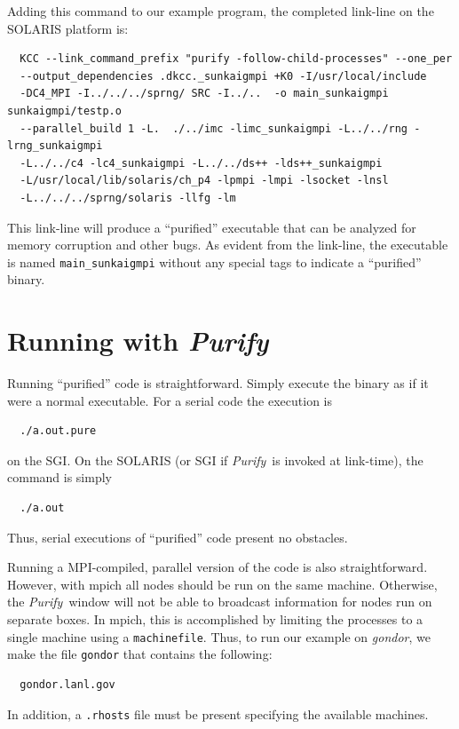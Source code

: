 \documentclass[note]{newmemo}
\newcommand{\purify}{\textsl{Purify}}
\newcommand{\pkg}[1]{\textsf{#1}}
\newcommand{\dir}[1]{\textsl{#1}}
\begin{document}
Adding this command to our example program, the completed link-line
on the SOLARIS platform is:
\begin{verbatim}
  KCC --link_command_prefix "purify -follow-child-processes" --one_per 
  --output_dependencies .dkcc._sunkaigmpi +K0 -I/usr/local/include 
  -DC4_MPI -I../../../sprng/ SRC -I../..  -o main_sunkaigmpi sunkaigmpi/testp.o
  --parallel_build 1 -L.  ./../imc -limc_sunkaigmpi -L../../rng -lrng_sunkaigmpi
  -L../../c4 -lc4_sunkaigmpi -L../../ds++ -lds++_sunkaigmpi
  -L/usr/local/lib/solaris/ch_p4 -lpmpi -lmpi -lsocket -lnsl
  -L../../../sprng/solaris -llfg -lm
\end{verbatim}
This link-line will produce a ``purified'' executable that can be
analyzed for memory corruption and other bugs.  As evident from the
link-line, the executable is named {\tt main\_sunkaigmpi} without
any special tags to indicate a ``purified'' binary.


\section*{Running with \purify}

Running ``purified'' code is straightforward.  Simply execute the
binary as if it were a normal executable.  For a serial code the
execution is
\begin{verbatim}
  ./a.out.pure
\end{verbatim}
on the SGI.  On the SOLARIS (or SGI if \purify\ is invoked at
link-time), the command is simply
\begin{verbatim}
  ./a.out
\end{verbatim}
Thus, serial executions of ``purified'' code present no obstacles.

Running a MPI-compiled, parallel version of the code is also
straightforward.  However, with \pkg{mpich} all nodes should be run on
the same machine. Otherwise, the \purify\ window will not be able to
broadcast information for nodes run on separate boxes.  In
\pkg{mpich}, this is accomplished by limiting the processes to a single
machine using a {\tt machinefile}.  Thus, to run our example on
\dir{gondor}, we make the file {\tt gondor} that contains the
following:
\begin{verbatim}
  gondor.lanl.gov
\end{verbatim}
In addition, a {\tt .rhosts} file must be present specifying the
available machines.
\end{document}
